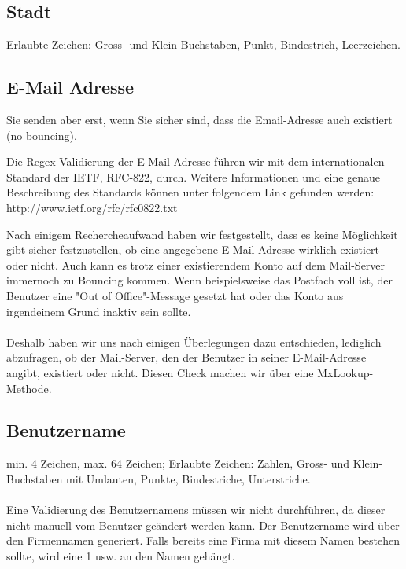 \documentclass[12pt]{scrartcl}
\begin{document}
\subsection{Stadt}
Erlaubte Zeichen: Gross- und Klein-Buchstaben, Punkt, Bindestrich, Leerzeichen.


\subsection{E-Mail Adresse}
Sie senden aber erst, wenn Sie sicher sind, dass die
Email-Adresse auch existiert (no bouncing).

Die Regex-Validierung der E-Mail Adresse führen wir mit dem internationalen Standard der IETF, RFC-822, durch. Weitere Informationen und eine genaue Beschreibung des Standards können unter folgendem Link gefunden werden:\\
http://www.ietf.org/rfc/rfc0822.txt

\newpage

Nach einigem Rechercheaufwand haben wir festgestellt, dass es keine Möglichkeit gibt sicher festzustellen, ob eine angegebene E-Mail Adresse wirklich existiert oder nicht. Auch kann es trotz einer existierendem Konto auf dem Mail-Server immernoch zu Bouncing kommen. Wenn beispielsweise das Postfach voll ist, der Benutzer eine "Out of Office"-Message gesetzt hat oder das Konto aus irgendeinem Grund inaktiv sein sollte.\\\\Deshalb haben wir uns nach einigen Überlegungen dazu entschieden, lediglich abzufragen, ob der Mail-Server, den der Benutzer in seiner E-Mail-Adresse angibt, existiert oder nicht. Diesen Check machen wir über eine MxLookup-Methode.

\newpage
\subsection{Benutzername}
min. 4 Zeichen, max. 64 Zeichen; Erlaubte Zeichen:
Zahlen, Gross- und Klein-Buchstaben mit Umlauten, Punkte, Bindestriche, Unterstriche. \\\\
Eine Validierung des Benutzernamens müssen wir nicht durchführen, da dieser nicht manuell vom Benutzer geändert werden kann. Der Benutzername wird über den Firmennamen generiert. Falls bereits eine Firma mit diesem Namen bestehen sollte, wird eine 1 usw. an den Namen gehängt.

\end{document}
